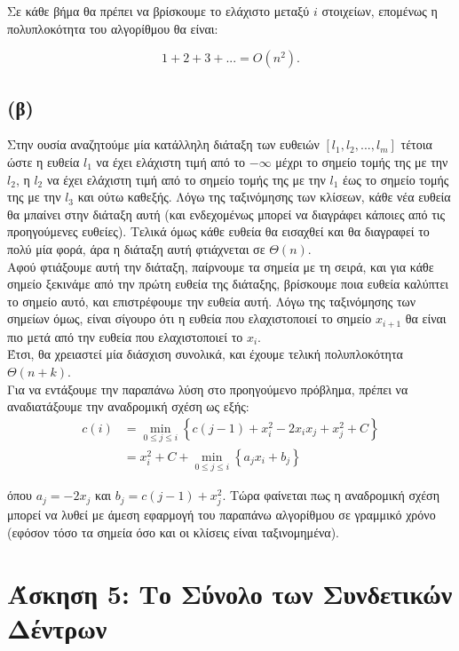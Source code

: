 			Σε κάθε βήμα θα πρέπει να βρίσκουμε το ελάχιστο μεταξύ $i$ στοιχείων, επομένως η πολυπλοκότητα του αλγορίθμου θα είναι:
			
			\[
				1 + 2 + 3 + ... = O(n^2).
			\] 
		
		\subsection*{(β)}
			Στην ουσία αναζητούμε μία κατάλληλη διάταξη των ευθειών $[l_1, l_2,...,l_m]$ τέτοια ώστε η ευθεία $l_1$ να έχει ελάχιστη τιμή από το $-\infty$ μέχρι το σημείο τομής της με την $l_2$, η $l_2$ να έχει ελάχιστη τιμή από το σημείο τομής της με την $l_1$ έως το σημείο τομής της με την $l_3$ και ούτω καθεξής. Λόγω της ταξινόμησης των κλίσεων, κάθε νέα ευθεία θα μπαίνει στην διάταξη αυτή (και ενδεχομένως μπορεί να διαγράφει κάποιες από τις προηγούμενες ευθείες). Τελικά όμως κάθε ευθεία θα εισαχθεί και θα διαγραφεί το πολύ μία φορά, άρα η διάταξη αυτή φτιάχνεται σε $Θ(n)$. \\
			
			Αφού φτιάξουμε αυτή την διάταξη, παίρνουμε τα σημεία με τη σειρά, και για κάθε σημείο ξεκινάμε από την πρώτη ευθεία της διάταξης, βρίσκουμε ποια ευθεία καλύπτει το σημείο αυτό, και επιστρέφουμε την ευθεία αυτή. Λόγω της ταξινόμησης των σημείων όμως, είναι σίγουρο ότι η ευθεία που ελαχιστοποιεί το σημείο $x_{i+1}$ θα είναι πιο μετά από την ευθεία που ελαχιστοποιεί το $x_i$. \\
			
			Έτσι, θα χρειαστεί μία διάσχιση συνολικά, και έχουμε τελική πολυπλοκότητα $Θ(n+k)$. \\
			
			Για να εντάξουμε την παραπάνω λύση στο προηγούμενο πρόβλημα, πρέπει να αναδιατάξουμε την αναδρομική σχέση ως εξής: \\
			
			\begin{align*}
				c(i) &= \min_{0 \leq j \leq i} \left\{c(j - 1) + x_i^2 - 2x_ix_j + x_j^2 + C\right\} \\
				&= x_i^2 + C + \min_{0 \leq j \leq i} \left\{a_jx_i + b_j\right\}
			\end{align*}
			
			όπου $a_j = -2x_j$ και $b_j=c(j-1)+x_j^2$. Τώρα φαίνεται πως η αναδρομική σχέση μπορεί να λυθεί με άμεση εφαρμογή του παραπάνω αλγορίθμου σε γραμμικό χρόνο (εφόσον τόσο τα σημεία όσο και οι κλίσεις είναι ταξινομημένα).
	
	\section*{Άσκηση 5: Το Σύνολο των Συνδετικών Δέντρων}
		

